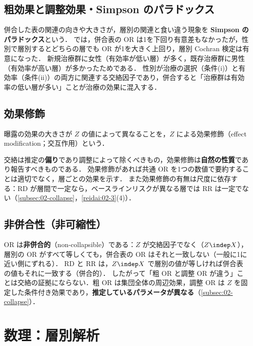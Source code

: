 \subsection{粗効果と調整効果・Simpson のパラドックス}\label{subsec:07-simpson}
\Hinshutsu 併合した表の関連の向きや大きさが，層別の関連と食い違う現象を \textbf{Simpson のパラドックス}という．
 では，併合表の OR は1を下回り有意差もなかったが，性別で層別するとどちらの層でも OR が1を大きく上回り，層別 Cochran 検定は有意になった．
新規治療群に女性（有効率が低い層）が多く，既存治療群に男性（有効率が高い層）が多かったためである．
性別が治療の選択（条件(i)）と有効率（条件(ii)）の両方に関連する交絡因子であり，併合すると「治療群は有効率の低い層が多い」ことが治療の効果に混入する．

\subsection{効果修飾}\label{sec:07-modification}
\begin{teigi}[効果修飾]\label{def:07-modification}
曝露の効果の大きさが $Z$ の値によって異なることを，$Z$ による効果修飾（effect modification；交互作用）という．
\end{teigi}
交絡は推定の\textbf{偏り}であり調整によって除くべきもの，効果修飾は\textbf{自然の性質}であり報告すべきものである．
効果修飾があれば共通 OR を1つの数値で要約することは適切でなく，層ごとの効果を示す．
また効果修飾の有無は尺度に依存する：RD が層間で一定なら，ベースラインリスクが異なる層では RR は一定でない（\cref{subsec:02-collapse}，\cref{reidai:02-3}(4)）．

\subsection{非併合性（非可縮性）}\label{subsec:07-noncollapse}
\Hissu OR は\textbf{非併合的}（non-collapsible）である：$Z$ が交絡因子でなく（$Z\indep X$），層別の OR がすべて等しくても，併合表の OR はそれと一致しない（一般に1に近い側にずれる）．
RD と RR は，$Z\indep X$ で層別の値が等しければ併合表の値もそれに一致する（併合的）．
したがって「粗 OR と調整 OR が違う」ことは交絡の証拠にならない．粗 OR は集団全体の周辺効果，調整 OR は $Z$ を固定した条件付き効果であり，\textbf{推定しているパラメータが異なる}（\cref{subsec:02-collapse}）．

\section{数理：層別解析}\label{sec:07-strat}
